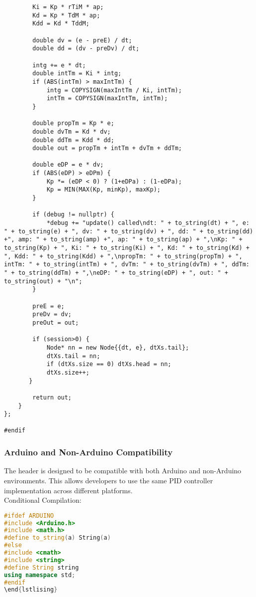 \documentclass[a4paper,12pt]{report}
\begin{document}
\begin{lstlising}[language=C++]
\begin{lstlisting}
        Ki = Kp * rTiM * ap;
        Kd = Kp * TdM * ap;
        Kdd = Kd * TddM;

        double dv = (e - preE) / dt;
        double dd = (dv - preDv) / dt;

        intg += e * dt;
        double intTm = Ki * intg;
        if (ABS(intTm) > maxIntTm) {
            intg = COPYSIGN(maxIntTm / Ki, intTm);
            intTm = COPYSIGN(maxIntTm, intTm);
        }

        double propTm = Kp * e;
        double dvTm = Kd * dv;
        double ddTm = Kdd * dd;
        double out = propTm + intTm + dvTm + ddTm;

        double eDP = e * dv;
        if (ABS(eDP) > eDPm) {
            Kp *= (eDP < 0) ? (1+eDPa) : (1-eDPa);
            Kp = MIN(MAX(Kp, minKp), maxKp);
        }

        if (debug != nullptr) {
            *debug += "update() called\ndt: " + to_string(dt) + ", e: " + to_string(e) + ", dv: " + to_string(dv) + ", dd: " + to_string(dd) +", amp: " + to_string(amp) +", ap: " + to_string(ap) + ",\nKp: " + to_string(Kp) + ", Ki: " + to_string(Ki) + ", Kd: " + to_string(Kd) + ", Kdd: " + to_string(Kdd) + ",\npropTm: " + to_string(propTm) + ", intTm: " + to_string(intTm) + ", dvTm: " + to_string(dvTm) + ", ddTm: " + to_string(ddTm) + ",\neDP: " + to_string(eDP) + ", out: " + to_string(out) + "\n";
        }

        preE = e;
        preDv = dv;
        preOut = out;

        if (session>0) {
            Node* nn = new Node{{dt, e}, dtXs.tail};
            dtXs.tail = nn;
            if (dtXs.size == 0) dtXs.head = nn;
            dtXs.size++;
       } 

        return out;
    }
};

#endif
\end{lstlisting}
\subsubsection{Arduino and Non-Arduino Compatibility}
The header is designed to be compatible with both Arduino and non-Arduino environments. This allows developers to use the same PID controller implementation across different platforms.\\
Conditional Compilation:
\begin{lstlisting}[language=C++]
#ifdef ARDUINO
#include <Arduino.h>
#include <math.h>
#define to_string(a) String(a)
#else
#include <cmath>
#include <string>
#define String string
using namespace std;
#endif
\end{lstlising}

\end{lstlisting}
\end{lstlising}
\end{document}
